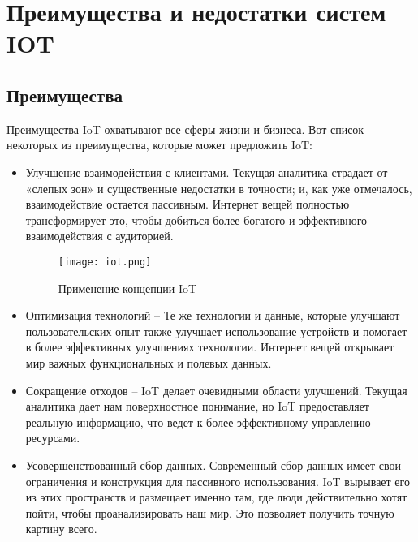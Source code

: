 \section{Преимущества и недостатки систем IOT}
\subsection{Преимущества}
Преимущества IoT охватывают все сферы жизни и бизнеса. Вот список некоторых из
преимущества, которые может предложить IoT:
\begin{itemize}
    \item Улучшение взаимодействия с клиентами. Текущая аналитика страдает от «слепых зон» и
    существенные недостатки в точности; и, как уже отмечалось, взаимодействие остается пассивным. Интернет вещей полностью
    трансформирует это, чтобы добиться более богатого и эффективного взаимодействия с аудиторией.
    \begin{figure}[h!]
        \centering
        \texttt{[image: iot.png]}
        \caption{Применение концепции IoT}
        \label{fig:section3:iot}
    \end{figure}
    \item Оптимизация технологий – Те же технологии и данные, которые улучшают
    пользовательских опыт также улучшает использование устройств и помогает в более эффективных улучшениях
    технологии. Интернет вещей открывает мир важных функциональных и полевых данных.
    \item Сокращение отходов – IoT делает очевидными области улучшений. Текущая аналитика дает нам
    поверхностное понимание, но IoT предоставляет реальную информацию, что ведет к более эффективному
    управлению ресурсами.
    \item  Усовершенствованный сбор данных. Современный сбор данных имеет свои ограничения и
    конструкция для пассивного использования. IoT вырывает его из этих пространств и размещает именно там, где
    люди действительно хотят пойти, чтобы проанализировать наш мир. Это позволяет получить точную картину всего.
\end{itemize}
